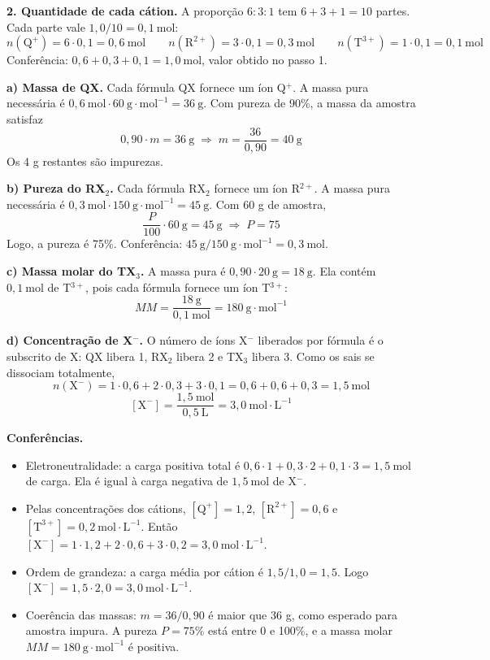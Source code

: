 \documentclass{article}%
\begin{document}
\textbf{2. Quantidade de cada cátion.} A proporção $6:3:1$ tem $6+3+1=10$ partes. Cada parte vale $1{,}0/10=0{,}1\ \mathrm{mol}$:
\[
n(\mathrm{Q}^{+})=6\cdot 0{,}1=0{,}6\ \mathrm{mol}\qquad n(\mathrm{R}^{2+})=3\cdot 0{,}1=0{,}3\ \mathrm{mol}\qquad n(\mathrm{T}^{3+})=1\cdot 0{,}1=0{,}1\ \mathrm{mol}
\]
Conferência: $0{,}6+0{,}3+0{,}1=1{,}0\ \mathrm{mol}$, valor obtido no passo 1.

\textbf{a) Massa de QX.} Cada fórmula QX fornece um íon Q$^{+}$. A massa pura necessária é $0{,}6\ \mathrm{mol}\cdot 60\ \mathrm{g\cdot mol^{-1}}=36\ \mathrm{g}$. Com pureza de 90\%, a massa da amostra satisfaz
\[
0{,}90\cdot m=36\ \mathrm{g}\;\Rightarrow\; m=\frac{36}{0{,}90}=40\ \mathrm{g}
\]
Os 4 g restantes são impurezas.

\textbf{b) Pureza do RX$_2$.} Cada fórmula RX$_2$ fornece um íon R$^{2+}$. A massa pura necessária é $0{,}3\ \mathrm{mol}\cdot 150\ \mathrm{g\cdot mol^{-1}}=45\ \mathrm{g}$. Com 60 g de amostra,
\[
\frac{P}{100}\cdot 60\ \mathrm{g}=45\ \mathrm{g}\;\Rightarrow\; P=75
\]
Logo, a pureza é 75\%. Conferência: $45\ \mathrm{g}/150\ \mathrm{g\cdot mol^{-1}}=0{,}3\ \mathrm{mol}$.

\textbf{c) Massa molar do TX$_3$.} A massa pura é $0{,}90\cdot 20\ \mathrm{g}=18\ \mathrm{g}$. Ela contém $0{,}1\ \mathrm{mol}$ de T$^{3+}$, pois cada fórmula fornece um íon T$^{3+}$:
\[
MM=\frac{18\ \mathrm{g}}{0{,}1\ \mathrm{mol}}=180\ \mathrm{g\cdot mol^{-1}}
\]

\textbf{d) Concentração de X$^{-}$.} O número de íons X$^{-}$ liberados por fórmula é o subscrito de X: QX libera 1, RX$_2$ libera 2 e TX$_3$ libera 3. Como os sais se dissociam totalmente,
\[
n(\mathrm{X}^{-})=1\cdot 0{,}6+2\cdot 0{,}3+3\cdot 0{,}1=0{,}6+0{,}6+0{,}3=1{,}5\ \mathrm{mol}
\]
\[
[\mathrm{X}^{-}]=\frac{1{,}5\ \mathrm{mol}}{0{,}5\ \mathrm{L}}=3{,}0\ \mathrm{mol\cdot L^{-1}}
\]

\textbf{Conferências.}
\begin{itemize}
\item Eletroneutralidade: a carga positiva total é $0{,}6\cdot 1+0{,}3\cdot 2+0{,}1\cdot 3=1{,}5\ \mathrm{mol}$ de carga. Ela é igual à carga negativa de $1{,}5\ \mathrm{mol}$ de X$^{-}$.
\item Pelas concentrações dos cátions, $[\mathrm{Q}^{+}]=1{,}2$, $[\mathrm{R}^{2+}]=0{,}6$ e $[\mathrm{T}^{3+}]=0{,}2\ \mathrm{mol\cdot L^{-1}}$. Então $[\mathrm{X}^{-}]=1\cdot 1{,}2+2\cdot 0{,}6+3\cdot 0{,}2=3{,}0\ \mathrm{mol\cdot L^{-1}}$.
\item Ordem de grandeza: a carga média por cátion é $1{,}5/1{,}0=1{,}5$. Logo $[\mathrm{X}^{-}]=1{,}5\cdot 2{,}0=3{,}0\ \mathrm{mol\cdot L^{-1}}$.
\item Coerência das massas: $m=36/0{,}90$ é maior que 36 g, como esperado para amostra impura. A pureza $P=75\%$ está entre 0 e 100\%, e a massa molar $MM=180\ \mathrm{g\cdot mol^{-1}}$ é positiva.
\end{itemize}
\end{document}
